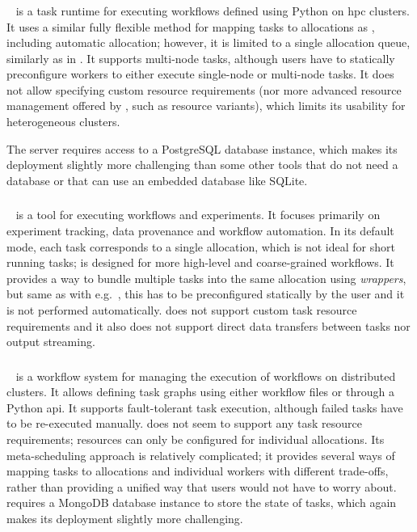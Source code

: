 \subsubsection*{\balsam}
\balsam~\cite{balsam} is a task runtime for executing workflows defined using Python on
\gls{hpc} clusters. It uses a similar fully flexible method for mapping tasks to
allocations
as \hyperqueue{}, including automatic allocation; however, it is limited to a single
allocation queue, similarly as in \dask{}. It supports multi-node tasks, although
users have to statically preconfigure workers to either execute single-node or multi-node tasks. It
does not allow specifying custom resource requirements (nor more advanced resource management
offered by \hyperqueue{}, such as resource variants), which limits its usability for
heterogeneous clusters.

The \balsam{} server requires access to a PostgreSQL database instance, which makes
its deployment slightly more challenging than some other tools that do not need a database or that
can use an embedded database like SQLite.

\subsubsection*{\autosubmit}
\autosubmit~\cite{autosubmit} is a tool for executing workflows and experiments. It focuses
primarily on experiment tracking, data provenance and workflow automation. In its default mode,
each task corresponds to a single allocation, which is not ideal for short running tasks;
\autosubmit is designed for more high-level and coarse-grained workflows. It provides a way to
bundle multiple tasks into the same allocation using \emph{wrappers}, but same as with
e.g.\ \pegasus{}, this has to be preconfigured statically by the user and it is not
performed automatically. \autosubmit{} does not support custom task resource requirements
and it also does not support direct data transfers between tasks nor output streaming.

\subsubsection*{\fireworks}
\fireworks~\cite{fireworks} is a workflow system for managing the execution of workflows on
distributed clusters. It allows defining task graphs using either workflow files or through a
Python \gls{api}. It supports fault-tolerant task execution, although failed tasks
have to be re-executed manually. \fireworks{} does not seem to support any task resource
requirements; resources can only be configured for individual allocations. Its meta-scheduling
approach is relatively complicated; it provides several ways of mapping tasks to allocations and
individual workers with different trade-offs, rather than providing a unified way that users would
not have to worry about. \fireworks{} requires a MongoDB database instance to store the
state of tasks, which again makes its deployment slightly more challenging.

